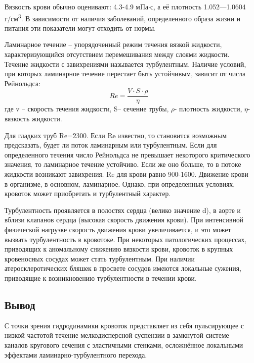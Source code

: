 Вязкость крови обычно оценивают: 4.3-4.9 мПа$\cdot$с, а её плотность 1.052—1.0604 г/см\textsuperscript{3}. В зависимости от наличия заболеваний, определенного образа жизни и питания эти показатели могут отходить от нормы. 

Ламинарное течение – упорядоченный режим течения вязкой жидкости, характеризующийся отсутствием перемешивания между слоями жидкости. Течение жидкости с завихрениями называется турбулентным. 
Наличие условий, при которых ламинарное течение перестает быть устойчивым, зависит от числа Рейнольдса:
$$Re=\frac{V\cdot S\cdot \rho}{\eta}$$
где v – скорость течения жидкости, S– сечение трубы, $\rho$- плотность жидкости, $\eta$- вязкость жидкости.

Для гладких труб Re=2300. Если Re известно, то становится возможным предсказать, будет ли поток ламинарным или турбулентным. Если для определенного течения число Рейнольдса не превышает некоторого критического значения, то ламинарное течение устойчиво. Если же оно больше, то в потоке жидкости возникают завихрения. Re для крови равно 900-1600. Движение крови в организме, в основном, ламинарное. Однако, при определенных условиях, кровоток может приобретать и турбулентный характер.

Турбулентность проявляется в полостях сердца (велико значение d), в аорте и вблизи клапанов сердца (высокая скорость движения крови). При интенсивной физической нагрузке скорость движения крови увеличивается, и это может вызвать турбулентность в кровотоке. При некоторых патологических процессах, приводящих к аномальному снижению вязкости крови, кровоток в крупных кровеносных сосудах может стать турбулентным.  При наличии атеросклеротических бляшек в просвете сосудов имеются локальные сужения, приводящие к возникновению турбулентности в течении крови. 

\subsection{Вывод}
 С точки зрения гидродинамики кровоток представляет из себя пульсирующее с низкой частотой течение мелкодисперсной суспензии в замкнутой системе каналов кругового сечения с эластичными стенками, осложнённое локальными эффектами ламинарно-турбулентного перехода.
